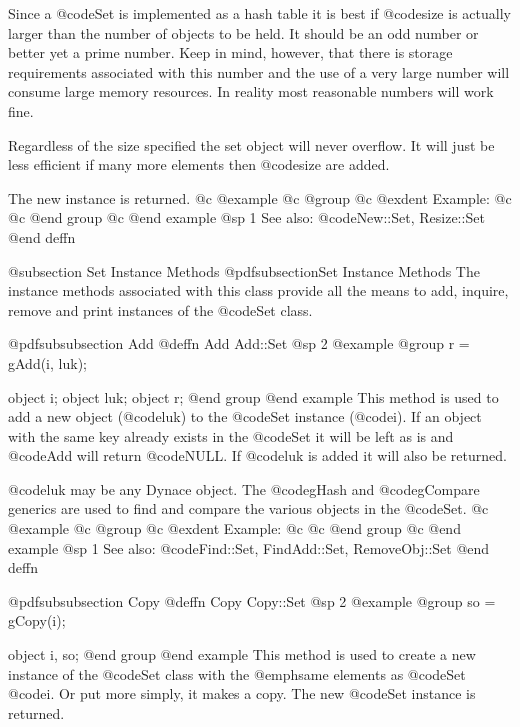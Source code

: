 Since a @code{Set} is implemented as a hash table it is best if @code{size}
is actually larger than the number of objects to be held.  It should
be an odd number or better yet a prime number.  Keep in mind, however,
that there is storage requirements associated with this number and
the use of a very large number will consume large memory resources.
In reality most reasonable numbers will work fine.

Regardless of the size specified the set object will never overflow.
It will just be less efficient if many more elements then @code{size}
are added.

The new instance is returned.
@c @example
@c @group
@c @exdent Example:
@c 
@c @end group
@c @end example
@sp 1
See also:  @code{New::Set, Resize::Set}
@end deffn





@subsection Set Instance Methods
@pdfsubsection{Set Instance Methods}
The instance methods associated with this class provide all the means
to add, inquire, remove and print instances of the @code{Set} class.












@pdfsubsubsection {Add}
@deffn {Add} Add::Set
@sp 2
@example
@group
r = gAdd(i, luk);

object  i;
object  luk;
object  r;
@end group
@end example
This method is used to add a new object (@code{luk}) to the @code{Set} instance
(@code{i}).  If an object with the same key already exists in the @code{Set} it
will be left as is and @code{Add} will return @code{NULL}.  If
@code{luk} is added it will also be returned.

@code{luk} may be any Dynace object.  The @code{gHash} and
@code{gCompare} generics are used to find and compare the various
objects in the @code{Set}.
@c @example
@c @group
@c @exdent Example:
@c 
@c @end group
@c @end example
@sp 1
See also:  @code{Find::Set, FindAdd::Set, RemoveObj::Set}
@end deffn











@pdfsubsubsection {Copy}
@deffn {Copy} Copy::Set
@sp 2
@example
@group
so = gCopy(i);

object  i, so;
@end group
@end example
This method is used to create a new instance of the @code{Set} class
with the @emph{same} elements as @code{Set} @code{i}.  Or put more simply,
it makes a copy.  The new @code{Set} instance is returned.

